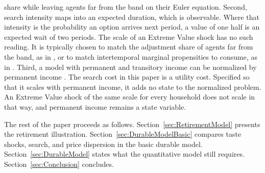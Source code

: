 share while leaving agents far from the band on their Euler equation. Second, search
intensity maps into an expected duration, which is observable. Where that intensity is
the probability an option arrives next period, a value of one half is an expected wait of
two periods. The scale of an Extreme Value shock has no such reading. It is typically chosen to match the adjustment share of agents far from
the band, as in \citet{McKay2021-ib}, or to match intertemporal marginal propensities
to consume, as in \citet{Beraja2024-ua}. Third, a model with permanent and transitory
income can be normalized by permanent income \citep{Carroll1992-bh}. The search
cost in this paper is a utility cost. Specified so that it scales with permanent income,
it adds no state to the normalized problem. An Extreme Value shock of the same scale
for every household does not scale in that way, and permanent income remains a state
variable.

The rest of the paper proceeds as follows. Section~\ref{sec:RetirementModel}
presents the retirement illustration. Section~\ref{sec:DurableModelBasic} compares
taste shocks, search, and price dispersion in the basic durable model.
Section~\ref{sec:DurableModel} states what the quantitative model still requires.
Section~\ref{sec:Conclusion} concludes.
